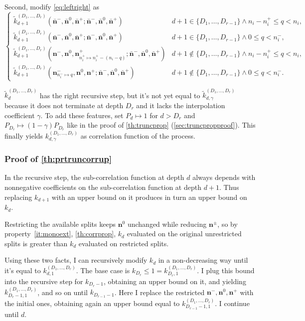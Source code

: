 \documentclass[a4paper]{article}
\newcommand{\nvecs}{\mathbf n^-, \mathbf n^0, \mathbf n^+}
\newcommand{\barnvecs}{\bar{\mathbf n}^-, \bar{\mathbf n}^0, \bar{\mathbf n}^+}
\theoremstyle{definition}
\begin{document}
    Second, modify \autoref{eq:leftright} as
    \begin{equation}
        \begin{cases}
            \tilde k^{(D_1,\ldots,D_r)}_{d+1}(\barnvecs; \barnvecs)
                & d+1 \in \{D_1,\ldots,D_{r-1}\} \land n_i - n^+_i \le q < n_i, \\
            \tilde k^{(D_1,\ldots,D_r)}_{d+1}(\barnvecs; \barnvecs)
                & d+1 \in \{D_1,\ldots,D_{r-1}\} \land 0 \le q < n^-_i, \\
            \tilde k^{(D_1,\ldots,D_r)}_{d+1}(\mathbf n^-, \mathbf n^0, \mathbf n^+_{n^+_i\mapsto n^+_i-(n_i-q)}; \barnvecs)
                & d+1 \notin \{D_1,\ldots,D_{r-1}\} \land n_i - n^+_i \le q < n_i, \\
            \tilde k^{(D_1,\ldots,D_r)}_{d+1}(\mathbf n^-_{n^-_i\mapsto q}, \mathbf n^0, \mathbf n^+; \barnvecs)
                & d+1 \notin \{D_1,\ldots,D_{r-1}\} \land 0 \le q < n^-_i.
        \end{cases}
    \end{equation}

    $\tilde k^{(D_1,\ldots,D_r)}_d$ has the right recursive step, but it's not yet equal to $\tilde k^{(D_1,\ldots,D_r)}_{d,\gamma}$ because it does not terminate at depth $D_r$ and it lacks the interpolation coefficient $\gamma$. To add these features, set $P_d \mapsto 1$ for $d > D_r$ and $P_{D_r} \mapsto (1 - \gamma) P_{D_r}$ like in the proof of \autoref{th:truncprop} (\autoref{sec:truncpropproof}). This finally yields $k^{(D_1,\ldots,D_r)}_{d,\gamma}$ as correlation function of the process.

    \subsubsection{Proof of \autoref{th:prtruncorrup}}

    In the recursive step, the sub-correlation function at depth $d$ always depends with nonnegative coefficients on the sub-correlation function at depth $d+1$. Thus replacing $k_{d+1}$ with an upper bound on it produces in turn an upper bound on $k_d$.

    Restricting the available splits keeps $\mathbf n^0$ unchanged while reducing $\mathbf n^\pm$, so by property~\ref{it:monoext}, \autoref{th:corrprop}, $k_d$ evaluated on the original unrestricted splits is greater than $k_d$ evaluated on restricted splits.

    Using these two facts, I can recursively modify $k_d$ in a non-decreasing way until it's equal to $k^{(D_1,\ldots,D_r)}_{d,1}$. The base case is $k_{D_r} \le 1 = k^{(D_1,\ldots,D_r)}_{D_r,1}$. I plug this bound into the recursive step for $k_{D_r - 1}$, obtaining an upper bound on it, and yielding $k^{(D_1,\ldots,D_r)}_{D_r-1,1}$, and so on until $k_{D_{r-1}-1}$. Here I replace the restricted $\nvecs$ with the initial ones, obtaining again an upper bound equal to $k^{(D_1,\ldots,D_r)}_{D_{r-1}-1,1}$. I continue until $d$.
\end{document}
